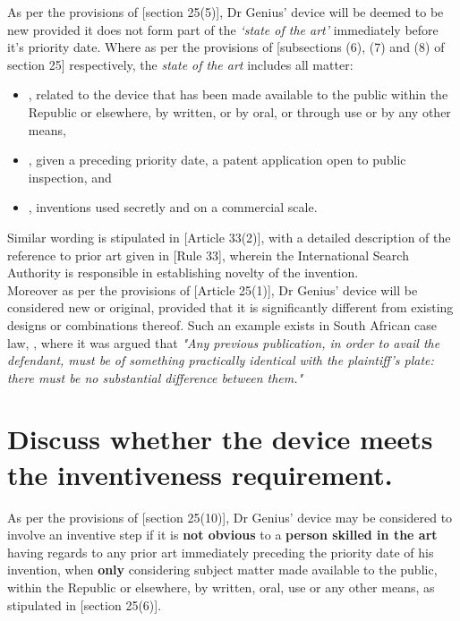 \documentclass[11pt]{article}
\begin{document}
As per the provisions of [section 25(5)]\cite{rsa78_patents_act}, Dr Genius'
device will be deemed to be new provided it does not form part of the \emph{`state of
the art'} immediately before it's priority date. Where as per the provisions of
[subsections (6), (7) and (8) of section 25]\cite{rsa78_patents_act} respectively,
the \emph{state of the art} includes all matter:
\begin{itemize}
\item\relax [subsection (6)], related to the device that has been made available to the public within the Republic or elsewhere, by written, or by oral, or through use or by any other means,
\item\relax [subsection (7)], given a preceding priority date, a patent application open to public inspection, and
\item\relax [subsection (8)], inventions used secretly and on a commercial scale.
\end{itemize}

Similar wording is stipulated in [Article 33(2)]\cite{wipo70_pct}, with a detailed description of the reference to prior art given in [Rule 33]\cite{wipo70_pct_reg}, wherein the International Search Authority is responsible in establishing novelty of the invention.\\

Moreover as per the provisions of [Article 25(1)]\cite{wto17_trips}, Dr Genius' device will be considered new or original, provided that it is significantly different from existing designs or combinations thereof. Such an example exists in South African case law,  \cite{davis42_levin_v_numplates}, where it was argued that \emph{"Any previous publication, in order to avail the defendant, must be of something practically identical with the plaintiff's plate: there must be no substantial difference between them."}

\section{Discuss whether the device meets the inventiveness requirement.}
\label{sec:orgdf9842d}
\label{sec:inventiveness}

As per the provisions of [section 25(10)]\cite{rsa78_patents_act}, Dr Genius' device may be considered to involve an inventive step if it is \textbf{not obvious} to a \textbf{person skilled in the art} having regards to any prior art immediately preceding the priority date of his invention, when \textbf{only} considering subject matter made available to the public, within the Republic or elsewhere, by written, oral, use or any other means, as stipulated in [section 25(6)]\cite{rsa78_patents_act}.\\
\end{document}
